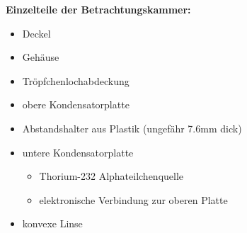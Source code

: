 \noindent \textbf{Einzelteile der Betrachtungskammer:}

\begin{itemize}\label{item:betrachtungskammer}
	\item Deckel
	\item Gehäuse
	\item Tröpfchenlochabdeckung
	\item obere Kondensatorplatte
	\item Abstandshalter aus Plastik (ungefähr 7.6mm dick)
	\item untere Kondensatorplatte
	\begin{itemize}
		\item Thorium-232 Alphateilchenquelle
		\item elektronische Verbindung zur oberen Platte
	\end{itemize}
	\item konvexe Linse
\end{itemize}


